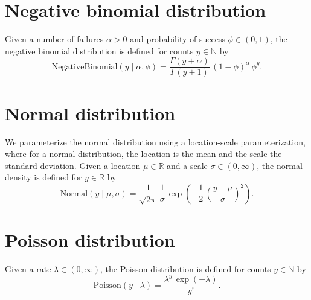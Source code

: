 \documentclass[11pt]{report}
\begin{document}
\section{Negative binomial distribution}

Given a number of failures $\alpha > 0$ and probability of success
$\phi \in (0, 1)$, the negative binomial distribution is defined for
counts $y \in \mathbb{N}$ by
\[
  \textrm{NegativeBinomial}(y \mid \alpha, \phi)
  = \frac{\Gamma(y + \alpha)}{\Gamma(y + 1)}
  \, (1 - \phi)^\alpha
  \, \phi^y.
\]


\section{Normal distribution}

We parameterize the normal distribution using a location-scale
parameterization, where for a normal distribution, the location is the
mean and the scale the standard deviation.  Given a location $\mu \in
\mathbb{R}$ and a scale $\sigma \in (0, \infty)$, the normal density
is defined for $y \in \mathbb{R}$ by
\[
  \textrm{Normal}(y \mid \mu, \sigma)
  = \frac{1}{\sqrt{2\pi}}
  \, \frac{1}{\sigma}
  \, \exp\!\left( -\frac{1}{2} \, \left( \frac{y - \mu}{\sigma}
                                  \right)^2
           \right).
\]

\section{Poisson distribution}

Given a rate $\lambda \in (0, \infty)$, the Poisson distribution is
defined for counts $y \in \mathbb{N}$ by
\[
  \textrm{Poisson}(y \mid \lambda)
  = \frac{\lambda^y \, \exp(-\lambda)}{y!}.
\]
\end{document}
